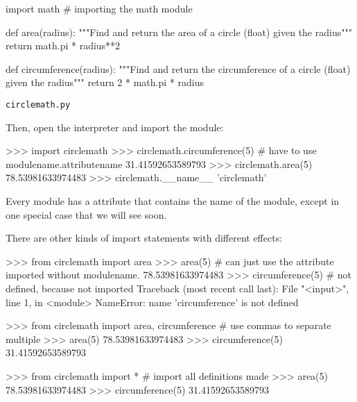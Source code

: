 \documentclass[11pt]{cselabheader}
\begin{document}
\begin{listing}[H]
\vspace{-0.5em}
\begin{python3code}
import math # importing the math module

def area(radius):
    """Find and return the area of a circle (float) given the radius"""
    return math.pi * radius**2

def circumference(radius):
    """Find and return the circumference of a circle (float) given the radius"""
    return 2 * math.pi * radius
\end{python3code}
\vspace{-1em}
\caption{\texttt{circlemath.py}}
\vspace{-0.5em}
\end{listing}

Then, open the interpreter and import the module:

\begin{pyconcode}
>>> import circlemath
>>> circlemath.circumference(5) # have to use modulename.attributename
31.41592653589793
>>> circlemath.area(5)
78.53981633974483
>>> circlemath.__name__
'circlemath'
\end{pyconcode}

Every module has a  attribute that contains the name of
the module, except in one special case that we will see soon.

There are other kinds of import statements with different effects:

\begin{pyconcode}
>>> from circlemath import area
>>> area(5) # can just use the attribute imported without modulename.
78.53981633974483
>>> circumference(5) # not defined, because not imported
Traceback (most recent call last):
  File "<input>", line 1, in <module>
NameError: name 'circumference' is not defined
\end{pyconcode}

\begin{pyconcode}
>>> from circlemath import area, circumference # use commas to separate multiple
>>> area(5)
78.53981633974483
>>> circumference(5)
31.41592653589793
\end{pyconcode}

\begin{pyconcode}
>>> from circlemath import * # import all definitions made
>>> area(5)
78.53981633974483
>>> circumference(5)
31.41592653589793
\end{pyconcode}
\end{document}
